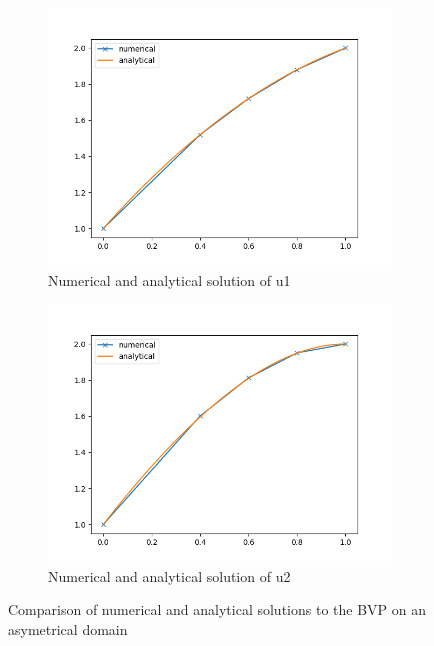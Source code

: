 \documentclass{article}
\begin{document}
\begin{figure}[H]
    \begin{subfigure}{.5\textwidth}
      \centering
      \includegraphics[width=.9\linewidth]{u1asym.png}
      \caption{Numerical and analytical solution of u1}
    \end{subfigure}%
    \begin{subfigure}{.5\textwidth}
      \centering
      \includegraphics[width=.9\linewidth]{u2asym.png}
      \caption{Numerical and analytical solution of u2}
    \end{subfigure}
    \caption{Comparison of numerical and analytical solutions to the BVP on an asymetrical domain}
\end{figure}
\end{document}
